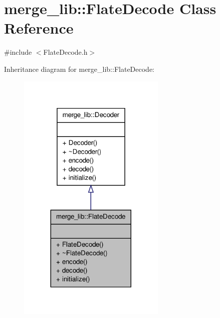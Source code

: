 \hypertarget{classmerge__lib_1_1_flate_decode}{\section{merge\-\_\-lib\-:\-:Flate\-Decode Class Reference}
\label{d3/d04/classmerge__lib_1_1_flate_decode}
}


{\ttfamily \#include $<$Flate\-Decode.\-h$>$}



Inheritance diagram for merge\-\_\-lib\-:\-:Flate\-Decode\-:
\nopagebreak
\begin{figure}[H]
\begin{center}
\leavevmode
\includegraphics[width=200pt]{d5/d0a/classmerge__lib_1_1_flate_decode__inherit__graph}
\end{center}
\end{figure}


